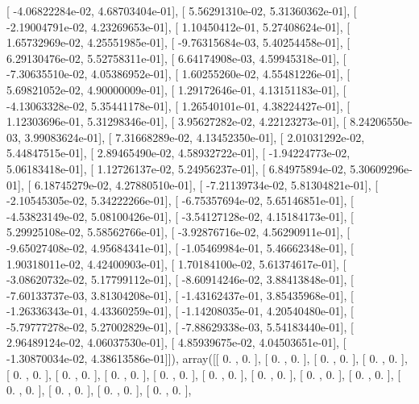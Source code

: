\documentclass{article}
\begin{document}
       [ -4.06822284e-02,   4.68703404e-01],
       [  5.56291310e-02,   5.31360362e-01],
       [ -2.19004791e-02,   4.23269653e-01],
       [  1.10450412e-01,   5.27408624e-01],
       [  1.65732969e-02,   4.25551985e-01],
       [ -9.76315684e-03,   5.40254458e-01],
       [  6.29130476e-02,   5.52758311e-01],
       [  6.64174908e-03,   4.59945318e-01],
       [ -7.30635510e-02,   4.05386952e-01],
       [  1.60255260e-02,   4.55481226e-01],
       [  5.69821052e-02,   4.90000009e-01],
       [  1.29172646e-01,   4.13151183e-01],
       [ -4.13063328e-02,   5.35441178e-01],
       [  1.26540101e-01,   4.38224427e-01],
       [  1.12303696e-01,   5.31298346e-01],
       [  3.95627282e-02,   4.22123273e-01],
       [  8.24206550e-03,   3.99083624e-01],
       [  7.31668289e-02,   4.13452350e-01],
       [  2.01031292e-02,   5.44847515e-01],
       [  2.89465490e-02,   4.58932722e-01],
       [ -1.94224773e-02,   5.06183418e-01],
       [  1.12726137e-02,   5.24956237e-01],
       [  6.84975894e-02,   5.30609296e-01],
       [  6.18745279e-02,   4.27880510e-01],
       [ -7.21139734e-02,   5.81304821e-01],
       [ -2.10545305e-02,   5.34222266e-01],
       [ -6.75357694e-02,   5.65146851e-01],
       [ -4.53823149e-02,   5.08100426e-01],
       [ -3.54127128e-02,   4.15184173e-01],
       [  5.29925108e-02,   5.58562766e-01],
       [ -3.92876716e-02,   4.56290911e-01],
       [ -9.65027408e-02,   4.95684341e-01],
       [ -1.05469984e-01,   5.46662348e-01],
       [  1.90318011e-02,   4.42400903e-01],
       [  1.70184100e-02,   5.61374617e-01],
       [ -3.08620732e-02,   5.17799112e-01],
       [ -8.60914246e-02,   3.88413848e-01],
       [ -7.60133737e-03,   3.81304208e-01],
       [ -1.43162437e-01,   3.85435968e-01],
       [ -1.26336343e-01,   4.43360259e-01],
       [ -1.14208035e-01,   4.20540480e-01],
       [ -5.79777278e-02,   5.27002829e-01],
       [ -7.88629338e-03,   5.54183440e-01],
       [  2.96489124e-02,   4.06037530e-01],
       [  4.85939675e-02,   4.04503651e-01],
       [ -1.30870034e-02,   4.38613586e-01]]), array([[ 0.        ,  0.        ],
       [ 0.        ,  0.        ],
       [ 0.        ,  0.        ],
       [ 0.        ,  0.        ],
       [ 0.        ,  0.        ],
       [ 0.        ,  0.        ],
       [ 0.        ,  0.        ],
       [ 0.        ,  0.        ],
       [ 0.        ,  0.        ],
       [ 0.        ,  0.        ],
       [ 0.        ,  0.        ],
       [ 0.        ,  0.        ],
       [ 0.        ,  0.        ],
       [ 0.        ,  0.        ],
       [ 0.        ,  0.        ],
       [ 0.        ,  0.        ],
\end{document}
